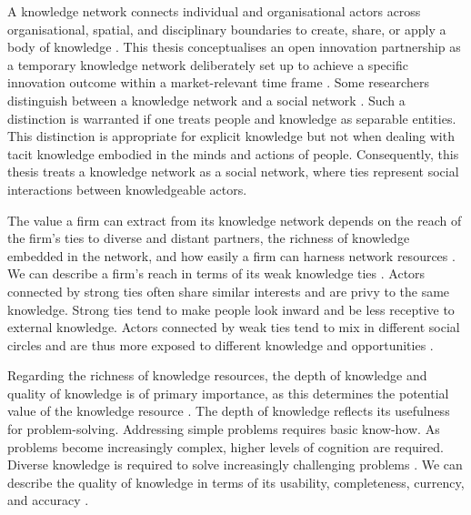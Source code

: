 A knowledge network connects individual and organisational actors across organisational, spatial, and disciplinary boundaries to create, share, or apply a body of knowledge \citep{pugh2013designing}. This thesis conceptualises an open innovation partnership as a temporary knowledge network deliberately set up to achieve a specific innovation outcome within a market-relevant time frame \citep{cococcioni2014exploring,terhorst2018tacit}. Some researchers distinguish between a knowledge network and a social network \citep[e.g.][]{yayavaram2008decomposability,wang2014knowledge,brennecke2017firm}. Such a distinction is warranted if one treats people and knowledge as separable entities. This distinction is appropriate for explicit knowledge but not when dealing with tacit knowledge embodied in the minds and actions of people. Consequently, this thesis treats a knowledge network as a social network, where ties represent social interactions between knowledgeable actors. \medskip

The value a firm can extract from its knowledge network depends on the reach of the firm's ties to diverse and distant partners, the richness of knowledge embedded in the network, and how easily a firm can harness network resources \citep{gulati2011networks,chesbrough2018value}. We can describe a firm's reach in terms of its weak knowledge ties \citep{granovetter1973strength,hansen1999search}. Actors connected by strong ties often share similar interests and are privy to the same knowledge. Strong ties tend to make people look inward and be less receptive to external knowledge. Actors connected by weak ties tend to mix in different social circles and are thus more exposed to different knowledge and opportunities \citep{granovetter1973strength}. \medskip

Regarding the richness of knowledge resources, the depth of knowledge and quality of knowledge is of primary importance, as this determines the potential value of the knowledge resource \citep{davenport1998working,kane2005knowledge,chesbrough2018value}. The depth of knowledge reflects its usefulness for problem-solving. Addressing simple problems requires basic know-how. As problems become increasingly complex, higher levels of cognition are required. Diverse knowledge is required to solve increasingly challenging problems \citep{webb2002depth,bennet2008depth,jeppesen2010marginality}. We can describe the quality of knowledge in terms of its usability, completeness, currency, and accuracy \citep{wixom2005theoretical}. \medskip

